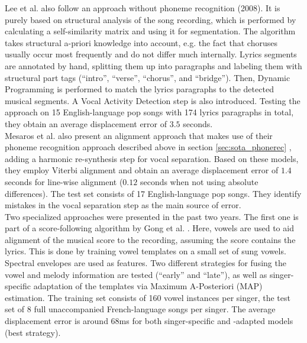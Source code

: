 Lee et al. also follow an approach without phoneme recognition \cite{LeeC08} (2008). It is purely based on structural analysis of the song recording, which is performed by calculating a self-similarity matrix and using it for segmentation. The algorithm takes structural a-priori knowledge into account, e.g. the fact that choruses usually occur most frequently and do not differ much internally. Lyrics segments are annotated by hand, splitting them up into paragraphs and labeling them with structural part tags (``intro'', ``verse'', ``chorus'', and ``bridge''). Then, Dynamic Programming is performed to match the lyrics paragraphs to the detected musical segments. A Vocal Activity Detection step is also introduced. Testing the approach on 15 English-language pop songs with 174 lyrics paragraphs in total, they obtain an average displacement error of $3.5$ seconds.\\ %

Mesaros et al. also present an alignment approach that makes use of their phoneme recognition approach described above in section \ref{sec:sota_phonerec} \cite{mesaros_alignment}, adding a harmonic re-synthesis step for vocal separation. Based on these models, they employ Viterbi alignment and obtain an average displacement error of $1.4$ seconds for line-wise alignment ($0.12$ seconds when not using absolute differences). The test set consists of 17 English-language pop songs. They identify mistakes in the vocal separation step as the main source of error.\\ %

Two specialized approaches were presented in the past two years. The first one is part of a score-following algorithm by Gong et al. \cite{gong_alignment}. Here, vowels are used to aid alignment of the musical score to the recording, assuming the score contains the lyrics. This is done by training vowel templates on a small set of sung vowels. Spectral envelopes are used as features. Two different strategies for fusing the vowel and melody information are tested (``early'' and ``late''), as well as singer-specific adaptation of the templates via Maximum A-Posteriori (MAP) estimation. The training set consists of 160 vowel instances per singer, the test set of 8 full unaccompanied French-language songs per singer.  The average displacement error is around 68ms for both singer-specific and -adapted models (best strategy).\\

